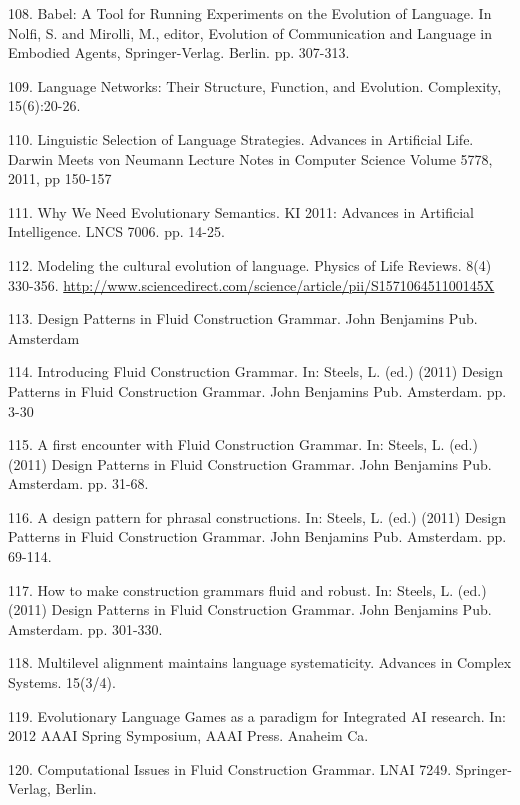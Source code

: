 108. \citet{Steels:10e} Babel: A Tool for Running Experiments on the Evolution of Language. In Nolfi, S. and Mirolli, M., editor, Evolution of Communication and Language in Embodied Agents, Springer-Verlag. Berlin. pp. 307-313.

109. \citet{sole:10f} Language Networks: Their Structure, Function, and Evolution. Complexity, 15(6):20-26. 

110. \citet{Bleys/Steels:11a} Linguistic Selection of Language Strategies. Advances in Artificial Life. Darwin Meets von Neumann Lecture Notes in Computer Science Volume 5778, 2011, pp 150-157

111. \citet{Steels:11b} Why We Need Evolutionary Semantics. KI 2011: Advances in Artificial Intelligence.  LNCS 7006. pp. 14-25. 

112. \citet{Steels:11c} Modeling the cultural evolution of language. Physics of Life Reviews. 8(4) 330-356. \url{http://www.sciencedirect.com/science/article/pii/S157106451100145X}

113. \citet{Steels:11d} Design Patterns in Fluid Construction Grammar. John Benjamins Pub. Amsterdam 

114. \citet{Steels:11e} Introducing Fluid Construction Grammar. In: Steels, L. (ed.) (2011) Design Patterns in Fluid Construction Grammar. John Benjamins Pub. Amsterdam. pp. 3-30

115. \citet{Steels:11f} A first encounter with Fluid Construction Grammar. In: Steels, L. (ed.) (2011) Design Patterns in Fluid Construction Grammar. John Benjamins Pub. Amsterdam. pp. 31-68. 

116. \citet{Steels:11g} A design pattern for phrasal constructions. In: Steels, L. (ed.) (2011) Design Patterns in Fluid Construction Grammar. John Benjamins Pub. Amsterdam. pp. 69-114. 

117. \citet{Steels:11h} How to make construction grammars fluid and robust. In: Steels, L. (ed.) (2011) Design Patterns in Fluid Construction Grammar. John Benjamins Pub. Amsterdam. pp. 301-330. 

118. \citet{Vantrijp:12a} Multilevel alignment maintains language systematicity. Advances in Complex Systems. 15(3/4). 

119. \citet{Steels:12b} Evolutionary Language Games as a paradigm for Integrated AI research. In: 2012 AAAI Spring Symposium, AAAI Press. 
Anaheim Ca. 

120. \citet{Steels:12c} Computational Issues in Fluid Construction Grammar. LNAI 7249. Springer-Verlag, Berlin. 

